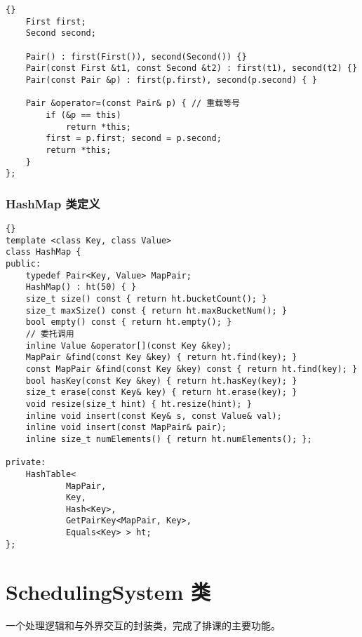 {\begin{lstlisting}[firstnumber=702, caption=Pair 类定义]{}
    First first;
    Second second;

    Pair() : first(First()), second(Second()) {}
    Pair(const First &t1, const Second &t2) : first(t1), second(t2) {}
    Pair(const Pair &p) : first(p.first), second(p.second) { }

    Pair &operator=(const Pair& p) { // 重载等号
        if (&p == this)
            return *this;
        first = p.first; second = p.second;
        return *this;
    }
};
\end{lstlisting}

\subsection{HashMap 类定义}
\begin{lstlisting}[firstnumber=736, caption=HashMap 类定义]{}
template <class Key, class Value>
class HashMap {
public:
    typedef Pair<Key, Value> MapPair;
    HashMap() : ht(50) { }
    size_t size() const { return ht.bucketCount(); }
    size_t maxSize() const { return ht.maxBucketNum(); }
    bool empty() const { return ht.empty(); }
    // 委托调用
    inline Value &operator[](const Key &key);
    MapPair &find(const Key &key) { return ht.find(key); }
    const MapPair &find(const Key &key) const { return ht.find(key); }
    bool hasKey(const Key &key) { return ht.hasKey(key); }
    size_t erase(const Key& key) { return ht.erase(key); }
    void resize(size_t hint) { ht.resize(hint); }
    inline void insert(const Key& s, const Value& val);
    inline void insert(const MapPair& pair);
    inline size_t numElements() { return ht.numElements(); };

private:
    HashTable<
            MapPair,
            Key,
            Hash<Key>,
            GetPairKey<MapPair, Key>,
            Equals<Key> > ht;
};
\end{lstlisting}

}


\chapter{SchedulingSystem 类}

一个处理逻辑和与外界交互的封装类，完成了排课的主要功能。

